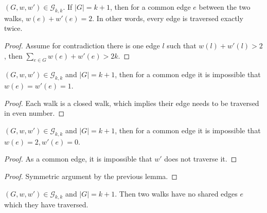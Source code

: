 \begin{lemma}
    \label{lem:traverse_exactly_twice}
    \notready
    $(G, w, w') \in \mathcal{G}_{k, k}$. If $|G| = k + 1$, then for a common edge $e$ between the two walks, $w(e) + w'(e) =2$. In other words, every edge is traversed exactly twice.
    \begin{proof}
        Assume for contradiction there is one edge $l$ such that $w(l) + w'(l) > 2$, then $\sum_{e \in G} w(e) + w'(e) > 2k$.
    \end{proof}
\end{lemma}


\begin{lemma}
    \label{lem:i_j_traverse_once}
    \notready
     $(G, w, w') \in \mathcal{G}_{k, k}$ and $|G| = k + 1$, then for a common edge it is impossible that $w(e) = w'(e) = 1$.
     \begin{proof}
       Each walk is a closed walk, which implies their edge needs to be traversed in even number.
     \end{proof}
\end{lemma}


\begin{lemma}
    \label{lem:walk_i_traverse_twice}
    \notready
     $(G, w, w') \in \mathcal{G}_{k, k}$ and $|G| = k + 1$, then for a common edge it is impossible that $w(e) = 2, w'(e) = 0$.
     \begin{proof}
      As a common edge, it is impossible that $w'$ does not traverse it.
     \end{proof}
\end{lemma}


\begin{lemma}
    \label{lem:walk_j_traverse_twice}
    \notready
    \begin{proof}
     Symmetric argument by the previous lemma.
    \end{proof}
\end{lemma}


\begin{lemma}
    \label{lem:no_shared_edges}
    $(G, w, w') \in \mathcal{G}_{k, k}$ and $|G| = k + 1$. Then two walks have no shared edges $e$ which they have traversed.
\end{lemma}



